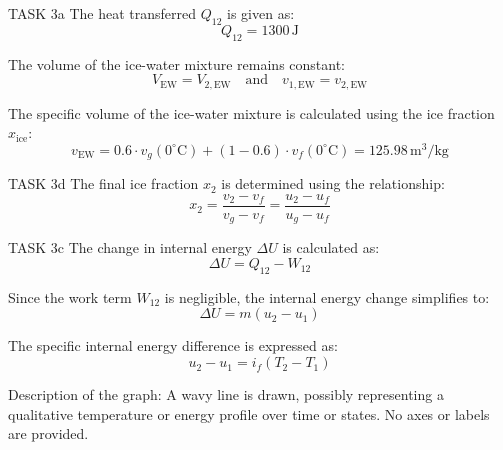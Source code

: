 TASK 3a  
The heat transferred \( Q_{12} \) is given as:  
\[
Q_{12} = 1300 \, \text{J}
\]

The volume of the ice-water mixture remains constant:  
\[
V_{\text{EW}} = V_{2,\text{EW}} \quad \text{and} \quad v_{1,\text{EW}} = v_{2,\text{EW}}
\]

The specific volume of the ice-water mixture is calculated using the ice fraction \( x_{\text{ice}} \):  
\[
v_{\text{EW}} = 0.6 \cdot v_g(0^\circ\text{C}) + (1 - 0.6) \cdot v_f(0^\circ\text{C}) = 125.98 \, \text{m}^3/\text{kg}
\]

TASK 3d  
The final ice fraction \( x_2 \) is determined using the relationship:  
\[
x_2 = \frac{v_2 - v_f}{v_g - v_f} = \frac{u_2 - u_f}{u_g - u_f}
\]

TASK 3c  
The change in internal energy \( \Delta U \) is calculated as:  
\[
\Delta U = Q_{12} - W_{12}
\]

Since the work term \( W_{12} \) is negligible, the internal energy change simplifies to:  
\[
\Delta U = m(u_2 - u_1)
\]

The specific internal energy difference is expressed as:  
\[
u_2 - u_1 = i_f(T_2 - T_1)
\]

Description of the graph:  
A wavy line is drawn, possibly representing a qualitative temperature or energy profile over time or states. No axes or labels are provided.